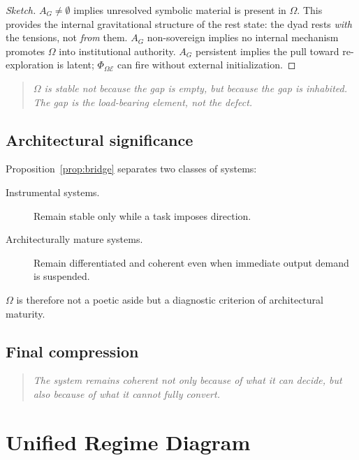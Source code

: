 \documentclass[12pt, a4paper]{article}
\theoremstyle{definition}
\theoremstyle{plain}
\theoremstyle{remark}
\begin{document}
\begin{proof}[Sketch]
$A_G \neq \emptyset$ implies unresolved symbolic material is present in
$\Omega$.
This provides the internal gravitational structure of the rest state:
the dyad rests \emph{with} the tensions, not \emph{from} them.
$A_G$ non-sovereign implies no internal mechanism promotes $\Omega$ into
institutional authority.
$A_G$ persistent implies the pull toward re-exploration is latent;
$\Phi_{\Omega\mathcal{E}}$ can fire without external initialization.
\end{proof}

\begin{quote}
\emph{$\Omega$ is stable not because the gap is empty,
but because the gap is inhabited.
The gap is the load-bearing element, not the defect.}
\end{quote}

\subsection{Architectural significance}

Proposition~\ref{prop:bridge} separates two classes of systems:
\begin{description}
\item[Instrumental systems.]
Remain stable only while a task imposes direction.
\item[Architecturally mature systems.]
Remain differentiated and coherent even when immediate output demand is
suspended.
\end{description}
$\Omega$ is therefore not a poetic aside but a diagnostic criterion of
architectural maturity.

\subsection{Final compression}

\begin{quote}
\emph{The system remains coherent not only because of what it can
decide, but also because of what it cannot fully convert.}
\end{quote}

\section{Unified Regime Diagram}
\label{sec:diagram}
\end{document}
